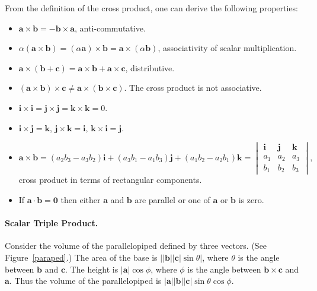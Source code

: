 From the definition of the cross product, one can derive the following 
properties:
\begin{itemize}
\item
$\mathbf{a} \times \mathbf{b} = - \mathbf{b} \times \mathbf{a}$, 
anti-commutative.
\item
$\alpha ( \mathbf{a} \times \mathbf{b} ) =
( \alpha \mathbf{a} ) \times \mathbf{b} =
\mathbf{a} \times ( \alpha \mathbf{b} )$, associativity of scalar 
multiplication.
\item
$\mathbf{a} \times ( \mathbf{b} + \mathbf{c} ) = 
\mathbf{a} \times \mathbf{b} + \mathbf{a} \times \mathbf{c}$,
distributive.
\item
$( \mathbf{a} \times \mathbf{b} ) \times \mathbf{c} \neq
\mathbf{a} \times ( \mathbf{b} \times \mathbf{c} )$.  The cross 
product is not associative.
\item
$ \mathbf{i} \times \mathbf{i} = \mathbf{j} \times \mathbf{j} =
\mathbf{k} \times \mathbf{k} = 0$.
\item
$ \mathbf{i} \times \mathbf{j} = \mathbf{k}$, 
$\mathbf{j} \times \mathbf{k} = \mathbf{i}$,
$\mathbf{k} \times \mathbf{i} = \mathbf{j}$.
\item
\[
\mathbf{a} \times \mathbf{b} = 
(a_2 b_3 - a_3 b_2) \mathbf{i} + (a_3 b_1 - a_1 b_3) \mathbf{j}
+ (a_1 b_2 - a_2 b_1) \mathbf{k} =
\begin{vmatrix}
\mathbf{i} & \mathbf{j} & \mathbf{k} \\
a_1 & a_2 & a_3 \\
b_1 & b_2 & b_3
\end{vmatrix},
\]
cross product in terms of rectangular components.
\item
If $\mathbf{a} \cdot \mathbf{b} = \mathbf{0}$ then either $\mathbf{a}$ and 
$\mathbf{b}$ are parallel or one of $\mathbf{a}$ or $\mathbf{b}$ is zero.
\end{itemize}









\paragraph{Scalar Triple Product.}
Consider the volume of the parallelopiped defined by three vectors.
(See Figure~\ref{paraped}.)
The area of the base is $\left| |\mathbf{b}| |\mathbf{c}| \sin \theta \right|$, 
where $\theta$
is the angle between $\mathbf{b}$ and $\mathbf{c}$.  The height is
$| \mathbf{a} | \cos \phi$, where $\phi$ is the angle between
$\mathbf{b} \times \mathbf{c}$ and $\mathbf{a}$.  Thus the volume of 
the parallelopiped is 
$|\mathbf{a}| |\mathbf{b}| |\mathbf{c}| \sin \theta \cos \phi$.

